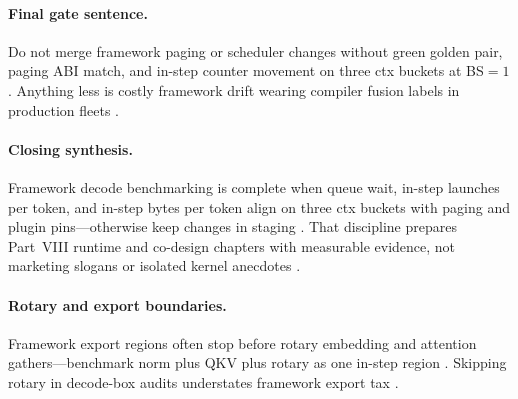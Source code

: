 \paragraph{Final gate sentence.} Do not merge framework paging or scheduler changes without green golden pair, paging ABI match, and in-step counter movement on three ctx buckets at BS${=}1$ \citep{kwon2023vllm,yirage2026,chen2020compilerbasedhardw,patel2025llminference,taxbreak2026,memoryfloor2026,liu2024deepseekv3,nvidia2024cudagraphs,dao2022flashattention,amd2024aie,amd2024xdna,dlbook,dao2023flashdecoding,nvidia2022hopper,semianalysis2024tma}. Anything less is costly framework drift wearing compiler fusion labels in production fleets \citep{memoryfloor2026,taxbreak2026,patel2025llminference,yirage2026,chen2020compilerbasedhardw,kwon2023vllm,dlbook}.

\paragraph{Closing synthesis.} Framework decode benchmarking is complete when queue wait, in-step launches per token, and in-step bytes per token align on three ctx buckets with paging and plugin pins---otherwise keep changes in staging \citep{patel2025llminference,taxbreak2026,memoryfloor2026,kwon2023vllm,yirage2026,chen2020compilerbasedhardw,liu2024deepseekv3,nvidia2024cudagraphs,dao2022flashattention,amd2024aie,amd2024xdna,dlbook,dao2023flashdecoding,nvidia2022hopper,semianalysis2024tma}. That discipline prepares Part~VIII runtime and co-design chapters with measurable evidence, not marketing slogans or isolated kernel anecdotes \citep{yirage2026,chen2020compilerbasedhardw,patel2025llminference,kwon2023vllm,dlbook}.



\paragraph{Rotary and export boundaries.} Framework export regions often stop before rotary embedding and attention gathers---benchmark norm plus QKV plus rotary as one in-step region \citep{patel2025llminference,yirage2026,chen2020compilerbasedhardw,memoryfloor2026,taxbreak2026,dao2022flashattention,kwon2023vllm,liu2024deepseekv3,nvidia2024cudagraphs,amd2024aie,amd2024xdna,dlbook,dao2023flashdecoding,nvidia2022hopper,semianalysis2024tma}. Skipping rotary in decode-box audits understates framework export tax \citep{memoryfloor2026,taxbreak2026,yirage2026,chen2020compilerbasedhardw,patel2025llminference,kwon2023vllm,dlbook}.

